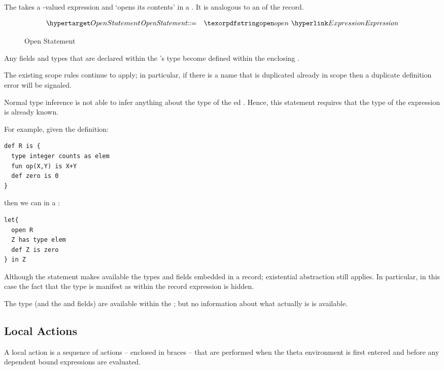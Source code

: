 The  takes a -valued expression and `opens its contents' in a . It is analogous to an  of the record.

\begin{figure}[htbp]
\begin{eqnarray*}
\ntDef{OpenStatement}&\arrow&\q{open}\ \ntRef{Expression}
\end{eqnarray*}
\caption{Open Statement}
\label{openStatementFig}
\end{figure}

Any fields and types that are declared within the 's type become defined within the enclosing .
\begin{aside}
The existing scope rules continue to apply; in particular, if there is a name that is duplicated already in scope then a duplicate definition error will be signaled. 
\end{aside}

\begin{aside}
Normal type inference is not able to infer anything about the type of the ed . Hence, this statement requires that the type of the expression is already known.
\end{aside}

For example, given the definition:
\begin{lstlisting}
def R is {
  type integer counts as elem
  fun op(X,Y) is X+Y
  def zero is 0
}
\end{lstlisting}
then we can   in a :
\begin{lstlisting}
let{
  open R
  Z has type elem
  def Z is zero
} in Z
\end{lstlisting}
\begin{aside}
Although the  statement makes available the types and fields embedded in a record; existential abstraction still applies. In particular, in this case the fact that the  type is manifest as  within the record expression  is hidden.

The  type (and the  and  fields) are available within the ; but no information about what  actually is is available.
\end{aside}

\subsection{Local Actions}
\label{localAction}
A local action is a sequence of actions -- enclosed in braces -- that are performed when the theta environment is first entered and before any dependent bound expressions are evaluated.

